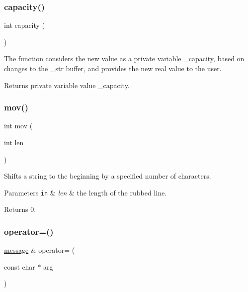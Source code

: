 \subsubsection{\texorpdfstring{capacity()}{capacity()}}
{\footnotesize\ttfamily int capacity (\begin{DoxyParamCaption}{ }\end{DoxyParamCaption})}



The function considers the new value as a private variable \+\_\+capacity, based on changes to the \+\_\+str buffer, and provides the new real value to the user. 

\begin{DoxyReturn}{Returns}
private variable value \+\_\+capacity. 
\end{DoxyReturn}
\mbox{\label{classmessage_a6add30ca9731721b8b271a11c7279932}} 
\subsubsection{\texorpdfstring{mov()}{mov()}}
{\footnotesize\ttfamily int mov (\begin{DoxyParamCaption}\item[{int}]{len }\end{DoxyParamCaption})}



Shifts a string to the beginning by a specified number of characters. 


\begin{DoxyParams}[1]{Parameters}
\mbox{\tt in}  & {\em len} & the length of the rubbed line. \\
\hline
\end{DoxyParams}
\begin{DoxyReturn}{Returns}
0. 
\end{DoxyReturn}
\mbox{\label{classmessage_a6264b8942d815bd3d999b2a9b6475825}} 
\subsubsection{\texorpdfstring{operator=()}{operator=()}}
{\footnotesize\ttfamily \hyperlink{classmessage}{message} \& operator= (\begin{DoxyParamCaption}\item[{const char $\ast$}]{arg }\end{DoxyParamCaption})}



